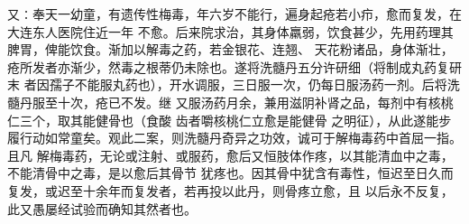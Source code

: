 \documentclass[a4paper,12pt,UTF8,twoside]{ctexbook}
\begin{document}
又∶奉天一幼童，有遗传性梅毒，年六岁不能行，遍身起疮若小疖，愈而复发，在大连东人医院住近一年 
不愈。后来院求治，其身体羸弱，饮食甚少，先用药理其脾胃，俾能饮食。渐加以解毒之药，若金银花、连翘、 
天花粉诸品，身体渐壮，疮所发者亦渐少，然毒之根蒂仍未除也。遂将洗髓丹五分许研细（将制成丸药复研末 
者因孺子不能服丸药也），开水调服，三日服一次，仍每日服汤药一剂。后将洗髓丹服至十次，疮已不发。继 
又服汤药月余，兼用滋阴补肾之品，每剂中有核桃仁三个，取其能健骨也（食酸 齿者嚼核桃仁立愈是能健骨 
之明征），从此遂能步履行动如常童矣。观此二案，则洗髓丹奇异之功效，诚可于解梅毒药中首屈一指。且凡 
解梅毒药，无论或注射、或服药，愈后又恒肢体作疼，以其能清血中之毒，不能清骨中之毒，是以愈后其骨节 
犹疼也。因其骨中犹含有毒性，恒迟至日久而复发，或迟至十余年而复发者，若再投以此丹，则骨疼立愈，且 
以后永不反复，此又愚屡经试验而确知其然者也。 
\end{document}

